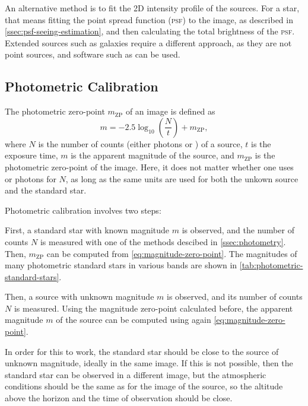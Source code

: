 \documentclass[a4paper, 11pt, fleqn]{memoir}
\begin{document}
An alternative method is to fit the 2D intensity profile of the sources.
For a star, that means fitting the point spread function (\textsc{psf}) to the image, as described in \cref{ssec:psf-seeing-estimation}, and then calculating the total brightness of the \textsc{psf}.
Extended sources such as galaxies require a different approach, as they are not point sources, and software such as  can be used.


\subsection{Photometric Calibration}
\label{ssec:photometric-calibration}

The photometric zero-point $m_\text{ZP}$ of an image is defined as
\begin{equation}
    \label{eq:magnitude-zero-point}
    m = -2.5 \log_{10} \left( \frac{N}{t} \right) + m_\text{ZP},
\end{equation}
where $N$ is the number of counts (either photons or \si{\adu}) of a source, $t$ is the exposure time, $m$ is the apparent magnitude of the source, and $m_\text{ZP}$ is the photometric zero-point of the image.
Here, it does not matter whether one uses \si{\adu} or photons for $N$, as long as the same units are used for both the unkown source and the standard star.

Photometric calibration involves two steps:

First, a standard star with known magnitude $m$ is observed, and the number of counts $N$ is measured with one of the methods descibed in \cref{ssec:photometry}. Then, $m_\text{ZP}$ can be computed from \cref{eq:magnitude-zero-point}.
The magnitudes of many photometric standard stars in various bands are shown in \cref{tab:photometric-standard-stars}.

Then, a source with unknown magnitude $m$ is observed, and its number of counts $N$ is measured. Using the magnitude zero-point calculated before, the apparent magnitude $m$ of the source can be computed using again \cref{eq:magnitude-zero-point}.

In order for this to work, the standard star should be close to the source of unknown magnitude, ideally in the same image.
If this is not possible, then the standard star can be observed in a different image, but the atmospheric conditions should be the same as for the image of the source, so the altitude above the horizon and the time of observation should be close.
\end{document}
